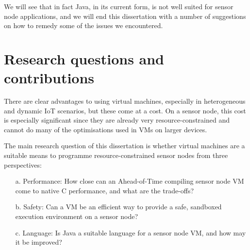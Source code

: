 We will see that in fact Java, in its current form, is not well suited for sensor node applications, and we will end this dissertation with a number of suggestions on how to remedy some of the issues we encountered.


\newpage
\section{Research questions and contributions}
\label{sec-introduction-research-questions}
There are clear advantages to using virtual machines, especially in heterogeneous and dynamic IoT scenarios, but these come at a cost. On a sensor node, this cost is especially significant since they are already very resource-constrained and cannot do many of the optimisations used in VMs on larger devices.

The main research question of this dissertation is whether virtual machines are a suitable means to programme resource-constrained sensor nodes from three perspectives:
\begin{enumerate}
    \item[a.] Performance: How close can an Ahead-of-Time compiling sensor node VM come to native C performance, and what are the trade-offs?
    \item[b.] Safety: Can a VM be an efficient way to provide a safe, sandboxed execution environment on a sensor node?
    \item[c.] Language: Is Java a suitable language for a sensor node VM, and how may it be improved?
\end{enumerate}

